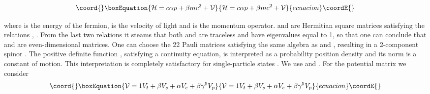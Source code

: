 \documentclass[a4paper,12pt,titlepage]{article}
\begin{document}
\begin{equation}\coord{}\boxEquation{
\mathcal{H}=c\alpha p+\beta mc^{2}+\mathcal{V}  \label{eq1a}
}{
\mathcal{H}=c\alpha p+\beta mc^{2}+\mathcal{V}  }{ecuacion}\coordE{}\end{equation}

\noindent where \coordHE{} is the energy of the fermion, \coordHE{} is the velocity of
light and \coordHE{} is the momentum operator. \myHighlight{$\alpha $}\coordHE{} and \myHighlight{$\beta $}\coordHE{} are Hermitian
square matrices satisfying the relations \coordHE{}, \coordHE{}. From the last two relations it steams
that both \myHighlight{$\alpha $}\coordHE{} and \myHighlight{$\beta $}\coordHE{} are traceless and have eigenvalues equal to 
\myHighlight{$-$}\coordHE{}1, so that one can conclude that \myHighlight{$\alpha $}\coordHE{} and \myHighlight{$\beta $}\coordHE{} are
even-dimensional matrices. One can choose the 2\myHighlight{$\times $}\coordHE{}2 Pauli matrices
satisfying the same algebra as \myHighlight{$\alpha $}\coordHE{} and \myHighlight{$\beta $}\coordHE{}, resulting in a
2-component spinor \myHighlight{$\Psi $}\coordHE{}. The positive definite function \coordHE{}, satisfying a continuity equation, is interpreted as a
probability position density and its norm is a constant of motion. This
interpretation is completely satisfactory for single-particle states \cite
{tha}. We use \coordHE{} and \coordHE{}. For the
potential matrix we consider 
\begin{equation}\coord{}\boxEquation{
\mathcal{V}=1V_{t}+\beta V_{s}+\alpha V_{e}+\beta \gamma ^{5}V_{p}
\label{eq2}
}{
\mathcal{V}=1V_{t}+\beta V_{s}+\alpha V_{e}+\beta \gamma ^{5}V_{p}
}{ecuacion}\coordE{}\end{equation}
\end{document}

